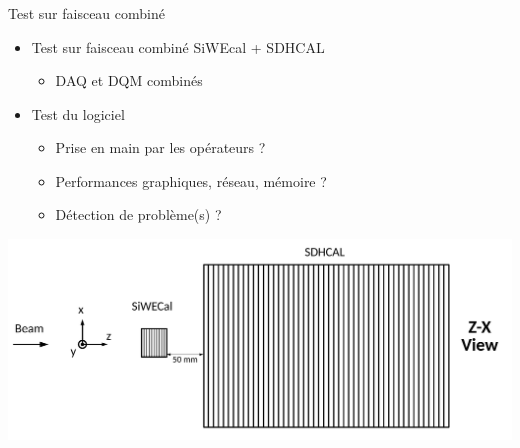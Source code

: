 \documentclass[8pt]{beamer}
\begin{document}
  \begin{frame}
  \frametitle{\secname}
  \framesubtitle{\subsecname}
    \begin{block}{Test sur faisceau combiné}
      \begin{itemize}
        \item Test sur faisceau combiné SiWEcal + SDHCAL
        \begin{itemize}
          \item DAQ et DQM combinés
        \end{itemize}
        \item Test du logiciel
        \begin{itemize}
          \item Prise en main par les opérateurs ?
          \item Performances graphiques, réseau, mémoire ?
          \item Détection de problème(s) ?
        \end{itemize}
      \end{itemize}
    \end{block}
    \begin{center}
      \includegraphics[width=\linewidth]{CombinedCaloSetup.pdf}
    \end{center}
  \end{frame}
\end{document}
